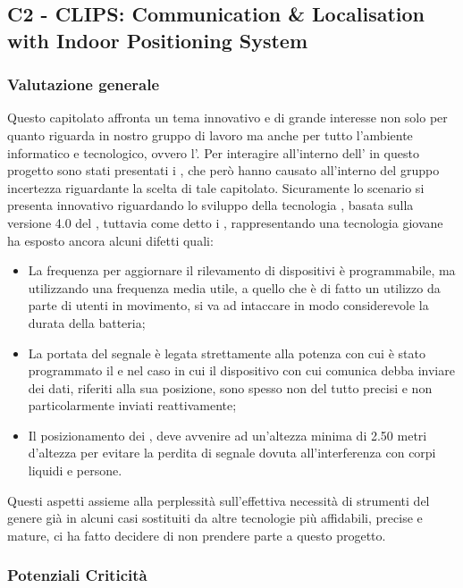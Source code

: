 \subsection{C2 - CLIPS: Communication \& Localisation with Indoor Positioning System}
\subsubsection{Valutazione generale}
Questo capitolato affronta un tema innovativo e di grande interesse non solo per quanto riguarda in nostro gruppo di lavoro ma anche per tutto l'ambiente informatico e tecnologico, ovvero l'.
Per interagire all'interno dell' in questo progetto sono stati presentati i , che per\`o hanno causato all'interno del gruppo incertezza riguardante la scelta di tale capitolato.
Sicuramente lo scenario si presenta innovativo riguardando lo sviluppo della tecnologia , basata sulla versione 4.0 del , tuttavia come detto i , rappresentando una tecnologia giovane ha esposto ancora alcuni difetti quali:
\begin{itemize}
	\item La frequenza per aggiornare il rilevamento di dispositivi \`e programmabile, ma utilizzando una frequenza media utile, a quello che \`e di fatto un utilizzo da parte di utenti in movimento, si va ad intaccare in modo considerevole la durata della batteria;
	\item La portata del segnale \`e legata strettamente alla potenza con cui \`e stato programmato il  e nel caso in cui il dispositivo con cui comunica debba inviare dei dati, riferiti alla sua posizione, sono spesso non del tutto precisi e non particolarmente inviati reattivamente;
	\item Il posizionamento dei , deve avvenire ad un'altezza minima di 2.50 metri d'altezza per evitare la perdita di segnale dovuta all'interferenza con corpi liquidi e persone.
\end{itemize}
Questi aspetti assieme alla perplessit\`a sull'effettiva necessit\`a di strumenti del genere gi\`a in alcuni casi sostituiti da altre tecnologie pi\`u affidabili, precise e mature, ci ha fatto decidere di non prendere parte a questo progetto.

\subsubsection{Potenziali Criticità}

